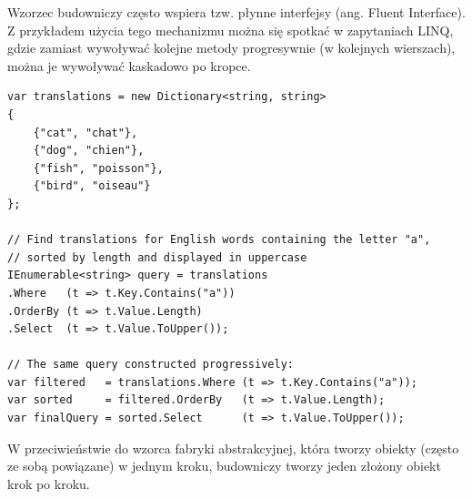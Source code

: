 Wzorzec budowniczy często wspiera tzw. płynne interfejsy (ang. Fluent Interface). Z przykładem użycia tego mechanizmu można się spotkać w zapytaniach LINQ, gdzie zamiast wywoływać kolejne metody progresywnie (w kolejnych wierszach), można je wywoływać kaskadowo po kropce.

\begin{lstlisting}[caption={Wykorzystanie płynnych interfejsów w zapytania LINQ}, label={lab2/lst/fluentInterfaceLinq}]
var translations = new Dictionary<string, string>
{
	{"cat", "chat"},
	{"dog", "chien"},
	{"fish", "poisson"},
	{"bird", "oiseau"}
};

// Find translations for English words containing the letter "a",
// sorted by length and displayed in uppercase
IEnumerable<string> query = translations
.Where   (t => t.Key.Contains("a"))
.OrderBy (t => t.Value.Length)
.Select  (t => t.Value.ToUpper());

// The same query constructed progressively:
var filtered   = translations.Where (t => t.Key.Contains("a"));
var sorted     = filtered.OrderBy   (t => t.Value.Length);
var finalQuery = sorted.Select      (t => t.Value.ToUpper());
\end{lstlisting}

W przeciwieństwie do wzorca fabryki abstrakcyjnej, która tworzy obiekty (często ze sobą powiązane) w jednym kroku, budowniczy tworzy jeden złożony obiekt krok po kroku.